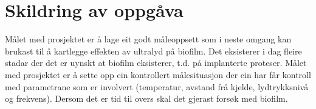 \section*{Skildring av oppgåva}
Målet med prosjektet er å lage eit godt måleoppsett som i neste omgang kan brukast til å kartlegge effekten av ultralyd på biofilm. Det eksisterer i dag fleire stadar der det er uynskt at biofilm eksisterer, t.d. på implanterte proteser. Målet med prosjektet er å sette opp ein kontrollert målesituasjon der ein har får kontroll med parametrane som er involvert (temperatur, avstand frå kjelde, lydtrykksnivå og frekvens). Dersom det er tid til overs skal det gjerast forsøk med biofilm.